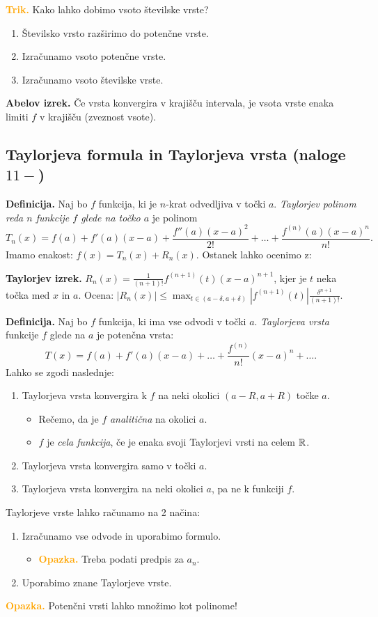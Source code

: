 \textbf{\textcolor{Orange}{Trik.}} Kako lahko dobimo vsoto številske vrste? 
\begin{enumerate}
    \item Številsko vrsto razširimo do potenčne vrste.
    \item Izračunamo vsoto potenčne vrste.
    \item Izračunamo vsoto številske vrste.
\end{enumerate}
\textbf{Abelov izrek.} Če vrsta konvergira v krajišču intervala, je vsota vrste enaka limiti $f$ v krajišču (zveznost vsote).

\newpage
{\color{Purple} \subsection*{Taylorjeva formula in Taylorjeva vrsta (naloge $11-$)}}
\textbf{Definicija.} Naj bo $f$ funkcija, ki je $n$-krat odvedljiva v točki $a$. \emph{Taylorjev polinom reda $n$ funkcije $f$ glede na točko $a$} je polinom $$T_n(x) = f(a) + f'(a)(x-a) + \frac{f''(a)(x-a)^2}{2!} + \ldots + \frac{f^{(n)}(a)(x-a)^n}{n!}.$$
Imamo enakost: $f(x) = T_n(x) + R_n(x)$. Ostanek lahko ocenimo z:

\textbf{Taylorjev izrek.} $\displaystyle R_n(x) = \frac{1}{(n+1)!} f^{(n+1)}(t)(x-a)^{n+1}$, kjer je $t$ neka točka med $x$ in $a$.
Ocena: $\displaystyle |R_n(x)| \leq \max_{t \in (a-\delta, a+\delta)} |f^{(n+1)}(t)| \frac{\delta^{n+1}}{(n+1)!}$.

\textbf{Definicija.} Naj bo $f$ funkcija, ki ima vse odvodi v točki $a$. \emph{Taylorjeva vrsta} funkcije $f$ glede na $a$ je potenčna vrsta:
$$T(x) = f(a) + f'(a)(x-a) + \ldots + \frac{f^{(n)}}{n!}(x-a)^n+\ldots.$$
Lahko se zgodi naslednje:
\begin{enumerate}
    \item Taylorjeva vrsta konvergira k $f$ na neki okolici $(a-R, a+R)$ točke $a$.
    \begin{itemize}
        \item Rečemo, da je $f$ \emph{analitična} na okolici $a$.
        \item $f$ je \emph{cela funkcija}, če je enaka svoji Taylorjevi vrsti na celem $\mathbb{R}$.
    \end{itemize}
    \item Taylorjeva vrsta konvergira samo v točki $a$.
    \item Taylorjeva vrsta konvergira na neki okolici $a$, pa ne k funkciji $f$.
\end{enumerate}
Taylorjeve vrste lahko računamo na 2 načina:
\begin{enumerate}
    \item Izračunamo vse odvode in uporabimo formulo.
    \begin{itemize}
        \item \textbf{\textcolor{Orange}{Opazka.}} Treba podati predpis za $a_n$.
    \end{itemize}
    \item Uporabimo znane Taylorjeve vrste.
\end{enumerate}
\textbf{\textcolor{Orange}{Opazka.}} Potenčni vrsti lahko množimo kot polinome!